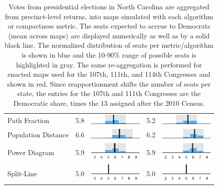 \begin{table}
\begin{tabular}{l rm{7em} rm{7em}}
Path Fraction          &   5.8 &    \includegraphics[width=7em]{mini_hist/NC_race_2012_path_frac} &   5.2 &    \includegraphics[width=7em]{mini_hist/NC_race_2016_path_frac} \\
Population Distance    &   6.6 &       \includegraphics[width=7em]{mini_hist/NC_race_2012_dist_p} &   6.2 &       \includegraphics[width=7em]{mini_hist/NC_race_2016_dist_p} \\
Power Diagram          &   5.9 &        \includegraphics[width=7em]{mini_hist/NC_race_2012_power_ax} &   5.9 &        \includegraphics[width=7em]{mini_hist/NC_race_2016_power_ax} \\
Split-Line             &   5.0 &        \includegraphics[width=7em]{mini_hist/NC_race_2012_split_ax} &   5.0 &        \includegraphics[width=7em]{mini_hist/NC_race_2016_split_ax} \\
\hline \hline
\end{tabular}
\caption{Votes from presidential elections in North Carolina are aggregated from precinct-level returns, into maps simulated with each algorithm or compactness metric. 
             The seats expected to accrue to Democrats (mean across maps) are displayed numerically as well as by a solid black line.
             The normalized distribution of seats per metric/algorithm is shown in blue and the 10-90\% range of possible seats is highlighted in gray.
             The same re-aggregation is performed for enacted maps used for the 107th, 111th, and 114th Congresses and shown in red.
             Since reapportionment shifts the number of seats per state,
               the entries for the 107th and 111th Congresses are the Democratic share,
               times the 13 assigned after the 2010 Census.
             }\label{tab:NC_race_seats}
\end{table}
 